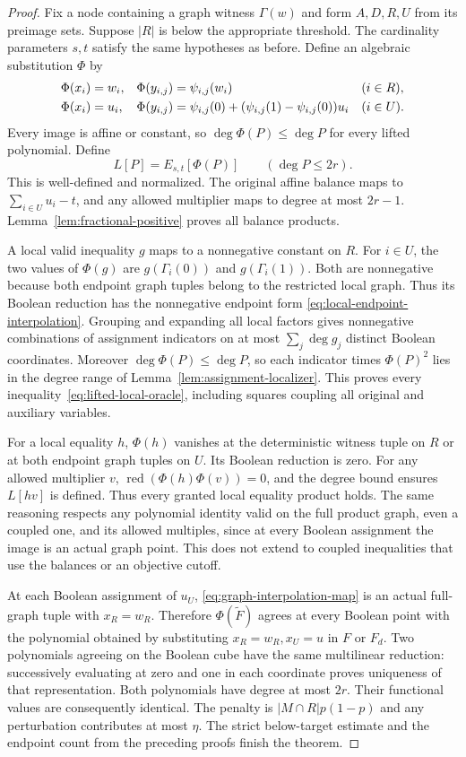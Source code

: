 \begin{proof}
Fix a node containing a graph witness $\Gamma(w)$ and form $A,D,R,U$
from its preimage sets. Suppose $|R|$ is below the appropriate threshold.
The cardinality parameters $s,t$ satisfy the same hypotheses as before.
Define an algebraic substitution $\Phi$ by
\begin{align}
 \Phi(x_i)&=w_i,&
 \Phi(y_{i,j})&=\psi_{i,j}(w_i) &&(i\in R),\notag\\
 \Phi(x_i)&=u_i,&
 \Phi(y_{i,j})&=\psi_{i,j}(0)
       +(\psi_{i,j}(1)-\psi_{i,j}(0))u_i &&(i\in U).
 \label{eq:graph-interpolation-map}
\end{align}
Every image is affine or constant, so
$\deg\Phi(P)\le\deg P$ for every lifted polynomial. Define
\[
 L[P]=E_{s,t}[\Phi(P)]\qquad(\deg P\le2r).
\]
This is well-defined and normalized. The original affine balance maps
to $\sum_{i\in U}u_i-t$, and any allowed multiplier maps to degree at
most $2r-1$. Lemma~\ref{lem:fractional-positive} proves all balance
products.

A local valid inequality $g$ maps to a nonnegative constant on $R$.
For $i\in U$, the two values of $\Phi(g)$ are
$g(\Gamma_i(0))$ and $g(\Gamma_i(1))$. Both are nonnegative because
both endpoint graph tuples belong to the restricted local graph.
Thus its Boolean reduction has the nonnegative endpoint form
\eqref{eq:local-endpoint-interpolation}. Grouping and expanding all
local factors gives nonnegative combinations of assignment indicators
on at most $\sum_j\deg g_j$ distinct Boolean coordinates. Moreover
$\deg\Phi(P)\le\deg P$, so each indicator times $\Phi(P)^2$ lies
in the degree range of Lemma~\ref{lem:assignment-localizer}.
This proves every inequality~\eqref{eq:lifted-local-oracle}, including
squares coupling all original and auxiliary variables.

For a local equality $h$, $\Phi(h)$ vanishes at the deterministic
witness tuple on $R$ or at both endpoint graph tuples on $U$. Its
Boolean reduction is zero. For any allowed multiplier $v$,
$\operatorname{red}(\Phi(h)\Phi(v))=0$, and the degree bound ensures
$L[hv]$ is defined. Thus every granted local equality product holds.
The same reasoning respects any polynomial identity valid on the full
product graph, even a coupled one, and its allowed multiples, since at
every Boolean assignment the image is an actual graph point. This does
not extend to coupled inequalities that use the balances or an objective
cutoff.

At each Boolean assignment of $u_U$, \eqref{eq:graph-interpolation-map}
is an actual full-graph tuple with $x_R=w_R$. Therefore
$\Phi(\widetilde F)$ agrees at every Boolean point with the polynomial
obtained by substituting $x_R=w_R,x_U=u$ in $F$ or $F_d$. Two
polynomials agreeing on the Boolean cube have the same multilinear
reduction: successively evaluating at zero and one in each coordinate
proves uniqueness of that representation. Both polynomials have degree
at most $2r$. Their functional values are consequently identical.
The penalty is $|M\cap R|p(1-p)$ and any perturbation contributes at
most $\eta$. The strict below-target estimate and the endpoint count
from the preceding proofs finish the theorem.
\end{proof}

